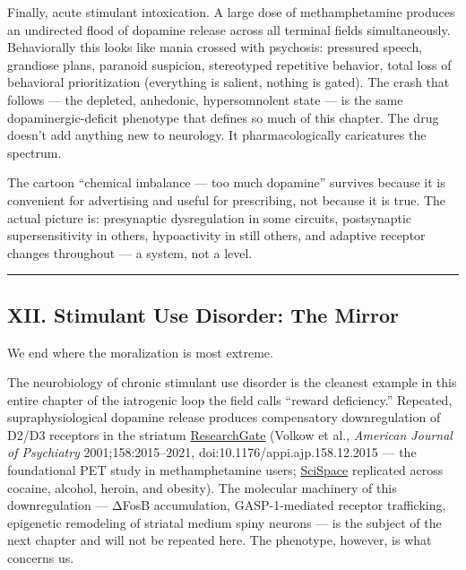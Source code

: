 Finally, acute stimulant intoxication. A large dose of methamphetamine produces an undirected flood of dopamine release across all terminal fields simultaneously. Behaviorally this looks like mania crossed with psychosis: pressured speech, grandiose plans, paranoid suspicion, stereotyped repetitive behavior, total loss of behavioral prioritization (everything is salient, nothing is gated). The crash that follows --- the depleted, anhedonic, hypersomnolent state --- is the same dopaminergic-deficit phenotype that defines so much of this chapter. The drug doesn't add anything new to neurology. It pharmacologically caricatures the spectrum.

The cartoon ``chemical imbalance --- too much dopamine'' survives because it is convenient for advertising and useful for prescribing, not because it is true. The actual picture is: presynaptic dysregulation in some circuits, postsynaptic supersensitivity in others, hypoactivity in still others, and adaptive receptor changes throughout --- a system, not a level.

\begin{center}\rule{0.5\linewidth}{0.5pt}\end{center}

\subsection{XII. Stimulant Use Disorder: The Mirror}\label{09_dopamine_spectrum-xii.-stimulant-use-disorder-the-mirror}

We end where the moralization is most extreme.

The neurobiology of chronic stimulant use disorder is the cleanest example in this entire chapter of the iatrogenic loop the field calls ``reward deficiency.'' Repeated, supraphysiological dopamine release produces compensatory downregulation of D2/D3 receptors in the striatum \href{https://www.researchgate.net/publication/11626946_Low_Level_of_Brain_Dopamine_D_2_Receptors_in_Methamphetamine_Abusers_Association_With_Metabolism_in_the_Orbitofrontal_Cortex}{ResearchGate} (Volkow et al., \emph{American Journal of Psychiatry} 2001;158:2015--2021, doi:10.1176/appi.ajp.158.12.2015 --- the foundational PET study in methamphetamine users; \href{https://scispace.com/papers/low-level-of-brain-dopamine-d2-receptors-in-methamphetamine-1xd66wjze9}{SciSpace} replicated across cocaine, alcohol, heroin, and obesity). The molecular machinery of this downregulation --- ΔFosB accumulation, GASP-1-mediated receptor trafficking, epigenetic remodeling of striatal medium spiny neurons --- is the subject of the next chapter and will not be repeated here. The phenotype, however, is what concerns us.


